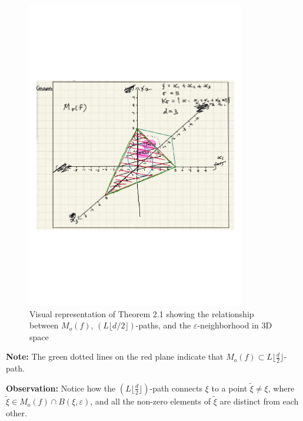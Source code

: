 \documentclass[12pt]{article}
\theoremstyle{definition}
\begin{document}
\begin{figure}[H]
\centering
\includegraphics[width=0.85\textwidth]{theorem21_graph.pdf}
\caption{Visual representation of Theorem 2.1 showing the relationship between $M_o(f)$, $(L\lfloor d/2 \rfloor)$-paths, and the $\varepsilon$-neighborhood in 3D space}
\label{fig:theorem21}
\end{figure}


\textbf{Note:} The green dotted lines on the red plane indicate that $M_o(f) \subset L\lfloor \frac{d}{2} \rfloor$-path.

\textbf{Observation:} Notice how the $(L\lfloor \frac{d}{2} \rfloor)$-path connects $\xi$ to a point $\tilde{\xi} \neq \xi$, where $\tilde{\xi} \in M_o(f) \cap B(\xi, \varepsilon)$, and all the non-zero elements of $\tilde{\xi}$ are distinct from each other.

\newpage
\end{document}

